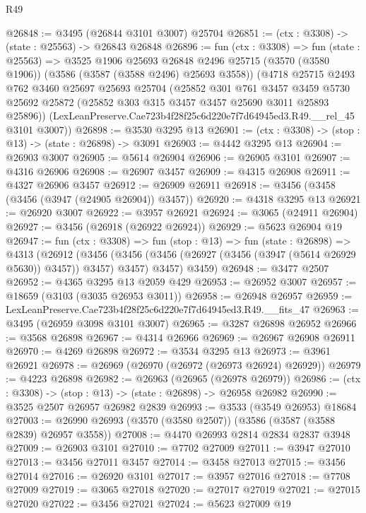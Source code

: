 \begin{lexlean}{R49}
\begin{coremodule}
@26848 := @3495 (@26844 @3101 @3007) @25704
@26851 := (ctx : @3308) -> (state : @25563) -> @26843 @26848
@26896 := fun (ctx : @3308) =>
  fun (state : @25563) =>
  @3525
    @1906
    @25693
    @26848
    @2496
    @25715
    (@3570 (@3580 @1906))
    (@3586 (@3587 (@3588 @2496) @25693 @3558))
    (@4718
      @25715
      @2493
      @762
      @3460
      @25697
      @25693
      @25704
      (@25852
        @301
        @761
        @3457
        @3459
        @5730
        @25692
        @25872
        (@25852 @303 @315 @3457 @3457 @25690 @3011 @25893 @25896))
      (LexLeanPreserve.Cae723b4f28f25c6d220e7f7d64945ed3.R49.__rel_45 @3101 @3007))
@26898 := @3530 @3295 @13
@26901 := (ctx : @3308) -> (stop : @13) -> (state : @26898) -> @3091
@26903 := @4442 @3295 @13
@26904 := @26903 @3007
@26905 := @5614 @26904
@26906 := @26905 @3101
@26907 := @4316 @26906
@26908 := @26907 @3457
@26909 := @4315 @26908
@26911 := @4327 @26906 @3457
@26912 := @26909 @26911
@26918 := @3456 (@3458 (@3456 (@3947 (@24905 @26904)) @3457))
@26920 := @4318 @3295 @13
@26921 := @26920 @3007
@26922 := @3957 @26921
@26924 := @3065 (@24911 @26904)
@26927 := @3456 (@26918 (@26922 @26924))
@26929 := @5623 @26904 @19
@26947 := fun (ctx : @3308) =>
  fun (stop : @13) =>
  fun (state : @26898) =>
  @4313
    (@26912
      (@3456 (@3456 (@3456 (@26927 (@3456 (@3947 (@5614 @26929 @5630)) @3457)) @3457) @3457) @3457)
      @3459)
@26948 := @3477 @2507
@26952 := @4365 @3295 @13 @2059 @429
@26953 := @26952 @3007
@26957 := @18659 (@3103 (@3035 @26953 @3011))
@26958 := @26948 @26957
@26959 := LexLeanPreserve.Cae723b4f28f25c6d220e7f7d64945ed3.R49.__fits_47
@26963 := @3495 (@26959 @3098 @3101 @3007)
@26965 := @3287 @26898 @26952
@26966 := @3568 @26898
@26967 := @4314 @26966
@26969 := @26967 @26908 @26911
@26970 := @4269 @26898
@26972 := @3534 @3295 @13
@26973 := @3961 @26921
@26978 := @26969 (@26970 (@26972 (@26973 @26924) @26929))
@26979 := @4223 @26898
@26982 := @26963 (@26965 (@26978 @26979))
@26986 := (ctx : @3308) -> (stop : @13) -> (state : @26898) -> @26958 @26982
@26990 := @3525 @2507 @26957 @26982 @2839
@26993 := @3533 (@3549 @26953) @18684
@27003 := @26990 @26993 (@3570 (@3580 @2507)) (@3586 (@3587 (@3588 @2839) @26957 @3558))
@27008 := @4470 @26993 @2814 @2834 @2837 @3948
@27009 := @26903 @3101
@27010 := @7702 @27009
@27011 := @3947 @27010
@27013 := @3456 @27011 @3457
@27014 := @3458 @27013
@27015 := @3456 @27014
@27016 := @26920 @3101
@27017 := @3957 @27016
@27018 := @7708 @27009
@27019 := @3065 @27018
@27020 := @27017 @27019
@27021 := @27015 @27020
@27022 := @3456 @27021
@27024 := @5623 @27009 @19

\end{coremodule}
\end{lexlean}
